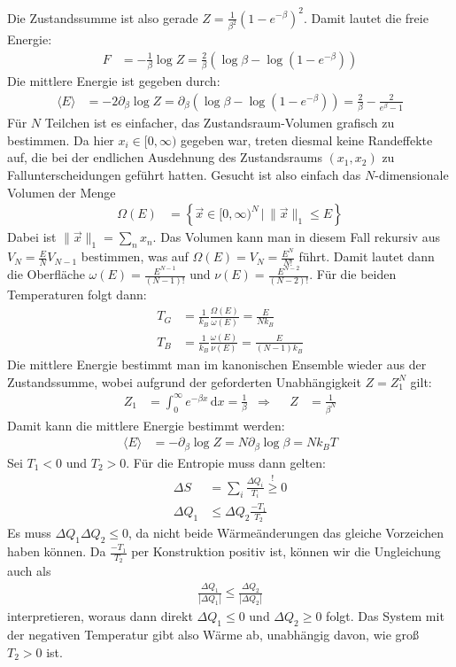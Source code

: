 \documentclass[a4paper,12pt]{article}
\newcommand{\bra}{}
\newcommand{\intx}{}
\newcommand{\kla}{}
\newcommand{\klammer}{}
\begin{document}
Die Zustandssumme ist also gerade $Z=\frac{1}{\beta^2}\kla\left( {1-e^{-\beta}} \right)^2$. Damit lautet die freie Energie:
\begin{align*}
F&=-\frac{1}{\beta}\log Z=\frac{2}{\beta}\kla\left( {\log\beta-\log(1-e^{-\beta})} \right)
\end{align*}
Die mittlere Energie ist gegeben durch:
\begin{align*}
\bra\langle {E}\rangle&=-2\partial_\beta\log Z=\partial_\beta\kla\left( {\log\beta-\log(1-e^{-\beta})} \right)=\frac{2}{\beta}-\frac{2}{e^{\beta}-1}
\end{align*}
Für $N$ Teilchen ist es einfacher, das Zustandsraum-Volumen grafisch zu bestimmen. Da hier $x_i\in [0,\infty)$ gegeben war, treten diesmal keine Randeffekte auf, die bei der endlichen Ausdehnung des Zustandsraums $(x_1,x_2)$ zu Fallunterscheidungen geführt hatten. Gesucht ist also einfach das $N$-dimensionale Volumen der Menge
\begin{align*}
\Omega(E)&=\klammer\left\{{\vec{x}\in [0,\infty)^N\,\vert\,\|\vec{x}\|_1\le E} \right\}
\end{align*}
Dabei ist $\|\vec{x}\|_1=\sum_nx_n$. Das Volumen kann man in diesem Fall rekursiv aus $V_N=\frac{E}{N}V_{N-1}$ bestimmen, was auf $\Omega(E)=V_N=\frac{E^N}{N!}$ führt. Damit lautet dann die Oberfläche $\omega(E)=\frac{E^{N-1}}{(N-1)!}$ und $\nu(E)=\frac{E^{N-2}}{(N-2)!}$. Für die beiden Temperaturen folgt dann:
\begin{align*}
T_G&=\frac{1}{k_B}\frac{\Omega(E)}{\omega(E)}=\frac{E}{Nk_B}\\
T_B&=\frac{1}{k_B}\frac{\omega(E)}{\nu(E)}=\frac{E}{(N-1)k_B}
\end{align*}
Die mittlere Energie bestimmt man im kanonischen Ensemble wieder aus der Zustandssumme, wobei aufgrund der geforderten Unabhängigkeit $Z=Z_1^N$ gilt:
\begin{align*}
Z_1&=\intx\int_{0}^{\infty}e^{-\beta x}\,\mathrm{d}x=\frac{1}{\beta}&\Rightarrow &&Z&=\frac{1}{\beta^N}
\end{align*}
Damit kann die mittlere Energie bestimmt werden:
\begin{align*}
\bra\langle {E}\rangle&=-\partial_\beta\log Z=N\partial_\beta\log\beta=Nk_BT
\end{align*}
Sei $T_1<0$ und $T_2>0$. Für die Entropie muss dann gelten:
\begin{align*}
\Delta S&=\sum_i\frac{\Delta Q_i}{T_i}\overset{!}{\ge} 0\\
\Delta Q_1&\le \Delta Q_2\frac{-T_1}{T_2}
\end{align*}
Es muss $\Delta Q_1\Delta Q_2\le 0$, da nicht beide Wärmeänderungen das gleiche Vorzeichen haben können. Da $\frac{-T_1}{T_2}$ per Konstruktion positiv ist, können wir die Ungleichung auch als
\begin{align*}
\frac{\Delta Q_1}{|\Delta Q_1|}\le\frac{\Delta Q_2}{|\Delta Q_2|}
\end{align*}
interpretieren, woraus dann direkt $\Delta Q_1\le 0$ und $\Delta Q_2\ge 0$ folgt. Das System mit der negativen Temperatur gibt also Wärme ab, unabhängig davon, wie groß $T_2>0$ ist.
\end{document}
